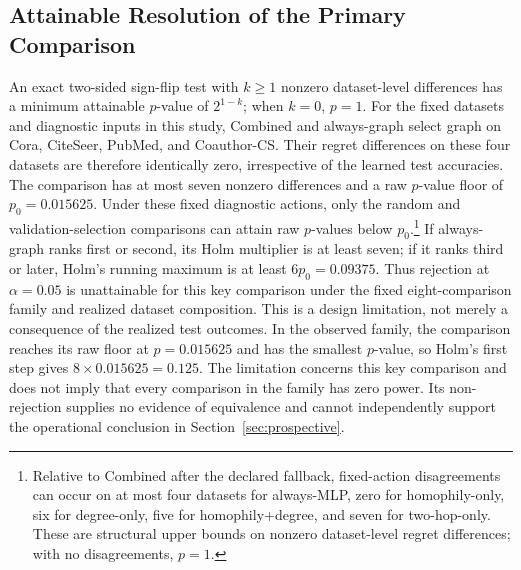 \subsection{Attainable Resolution of the Primary Comparison}
\label{app:holm_resolution}
An exact two-sided sign-flip test with $k\geq1$ nonzero dataset-level differences has a minimum attainable $p$-value of $2^{1-k}$; when $k=0$, $p=1$. For the fixed datasets and diagnostic inputs in this study, Combined and always-graph select graph on Cora, CiteSeer, PubMed, and Coauthor-CS. Their regret differences on these four datasets are therefore identically zero, irrespective of the learned test accuracies. The comparison has at most seven nonzero differences and a raw $p$-value floor of $p_0=0.015625$. Under these fixed diagnostic actions, only the random and validation-selection comparisons can attain raw $p$-values below $p_0$.\footnote{Relative to Combined after the declared fallback, fixed-action disagreements can occur on at most four datasets for always-MLP, zero for homophily-only, six for degree-only, five for homophily+degree, and seven for two-hop-only. These are structural upper bounds on nonzero dataset-level regret differences; with no disagreements, $p=1$.} If always-graph ranks first or second, its Holm multiplier is at least seven; if it ranks third or later, Holm's running maximum is at least $6p_0=0.09375$. Thus rejection at $\alpha=0.05$ is unattainable for this key comparison under the fixed eight-comparison family and realized dataset composition. This is a design limitation, not merely a consequence of the realized test outcomes. In the observed family, the comparison reaches its raw floor at $p=0.015625$ and has the smallest $p$-value, so Holm's first step gives $8\times0.015625=0.125$. The limitation concerns this key comparison and does not imply that every comparison in the family has zero power. Its non-rejection supplies no evidence of equivalence and cannot independently support the operational conclusion in Section~\ref{sec:prospective}.
